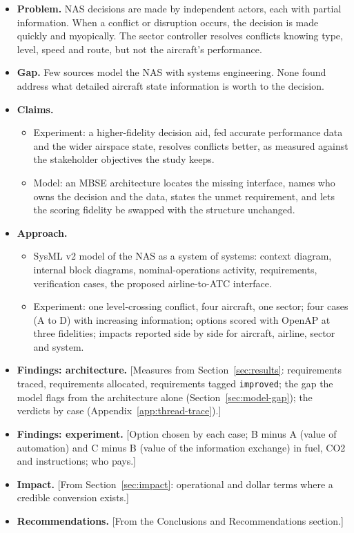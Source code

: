 \begin{itemize}
    \item \textbf{Problem.} NAS decisions are made by independent actors, each with partial information. When a conflict or disruption occurs, the decision is made quickly and myopically. The sector controller resolves conflicts knowing type, level, speed and route, but not the aircraft's performance.
    \item \textbf{Gap.} Few sources model the NAS with systems engineering. None found address what detailed aircraft state information is worth to the decision.
    \item \textbf{Claims.}
    \begin{itemize}
        \item Experiment: a higher-fidelity decision aid, fed accurate performance data and the wider airspace state, resolves conflicts better, as measured against the stakeholder objectives the study keeps.
        \item Model: an MBSE architecture locates the missing interface, names who owns the decision and the data, states the unmet requirement, and lets the scoring fidelity be swapped with the structure unchanged.
    \end{itemize}
    \item \textbf{Approach.}
    \begin{itemize}
        \item SysML v2 model of the NAS as a system of systems: context diagram, internal block diagrams, nominal-operations activity, requirements, verification cases, the proposed airline-to-ATC interface.
        \item Experiment: one level-crossing conflict, four aircraft, one sector; four cases (A to D) with increasing information; options scored with OpenAP at three fidelities; impacts reported side by side for aircraft, airline, sector and system.
    \end{itemize}
    \item \textbf{Findings: architecture.} [Measures from Section~\ref{sec:results}: requirements traced, requirements allocated, requirements tagged \texttt{improved}; the gap the model flags from the architecture alone (Section~\ref{sec:model-gap}); the verdicts by case (Appendix~\ref{app:thread-trace}).]
    \item \textbf{Findings: experiment.} [Option chosen by each case; B minus A (value of automation) and C minus B (value of the information exchange) in fuel, CO2 and instructions; who pays.]
    \item \textbf{Impact.} [From Section~\ref{sec:impact}: operational and dollar terms where a credible conversion exists.]
    \item \textbf{Recommendations.} [From the Conclusions and Recommendations section.]
\end{itemize}

